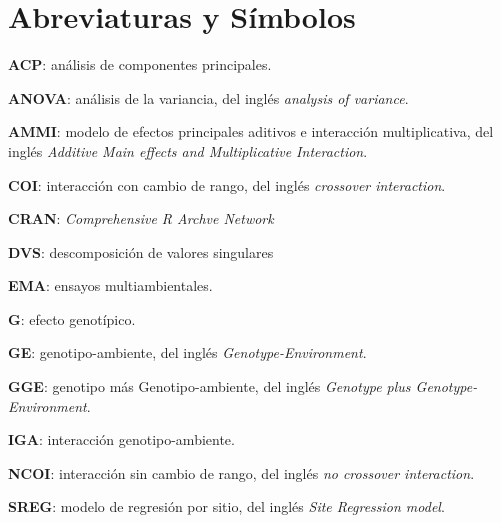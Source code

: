 

\chapter*{Abreviaturas y Símbolos}
\begin{description}
\item{\textbf{ACP}}: análisis de componentes principales.

\item{\textbf{ANOVA}}: análisis de la variancia, del inglés \emph{analysis of variance}.

\item{\textbf{AMMI}}: modelo de efectos principales aditivos e interacción multiplicativa, del inglés \emph{Additive Main effects and Multiplicative Interaction}.

\item{\textbf{COI}}: interacción con cambio de rango, del inglés \emph{crossover interaction}.

\item{\textbf{CRAN}}: \emph{Comprehensive R Archve Network}

\item{\textbf{DVS}}: descomposición de valores singulares

\item{\textbf{EMA}}: ensayos multiambientales.

\item{\textbf{G}}: efecto genotípico.

\item{\textbf{GE}}: genotipo-ambiente, del inglés \emph{Genotype-Environment}.

\item{\textbf{GGE}}: genotipo más Genotipo-ambiente, del inglés \emph{Genotype plus Genotype-Environment}.

\item{\textbf{IGA}}: interacción genotipo-ambiente.

\item{\textbf{NCOI}}: interacción sin cambio de rango, del inglés \emph{no crossover interaction}.

\item{\textbf{SREG}}: modelo de regresión por sitio, del inglés \emph{Site Regression model}.


\end{description}
